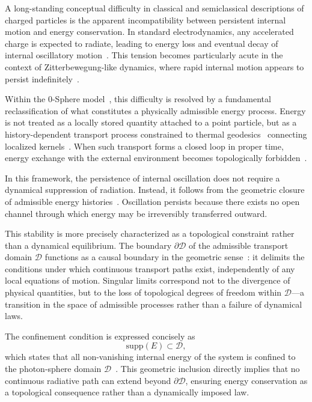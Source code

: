 \documentclass[12pt,a4paper]{article}
\begin{document}
\justifying

A long-standing conceptual difficulty in classical and semiclassical descriptions of charged particles is the apparent incompatibility between persistent internal motion and energy conservation. In standard electrodynamics, any accelerated charge is expected to radiate, leading to energy loss and eventual decay of internal oscillatory motion~\cite{dirac1938,jackson1999}. This tension becomes particularly acute in the context of Zitterbewegung-like dynamics, where rapid internal motion appears to persist indefinitely~\cite{schrodinger1930,hestenes1990,hanamura17765017,hanamura17765318,hanamura18356895}.

Within the 0-Sphere model~\cite{hanamura16759284}, this difficulty is resolved by a fundamental reclassification of what constitutes a physically admissible energy process. Energy is not treated as a locally stored quantity attached to a point particle, but as a history-dependent transport process constrained to thermal geodesics~\cite{hanamura17765349} connecting localized kernels~\cite{hanamura18067760,hanamura18135855,hanamura18203433}. When such transport forms a closed loop in proper time, energy exchange with the external environment becomes topologically forbidden~\cite{hanamura18275142}.

In this framework, the persistence of internal oscillation does not require a dynamical suppression of radiation. Instead, it follows from the geometric closure of admissible energy histories~\cite{hanamura18275142}. Oscillation persists because there exists no open channel through which energy may be irreversibly transferred outward.

This stability is more precisely characterized as a topological constraint rather than a dynamical equilibrium. The boundary $\partial\mathcal{D}$ of the admissible transport domain $\mathcal{D}$ functions as a causal boundary in the geometric sense~\cite{hanamura18356895}: it delimits the conditions under which continuous transport paths exist, independently of any local equations of motion. Singular limits correspond not to the divergence of physical quantities, but to the loss of topological degrees of freedom within $\mathcal{D}$---a transition in the space of admissible processes rather than a failure of dynamical laws.

The confinement condition is expressed concisely as
\begin{equation}
\mathrm{supp}(E) \subset \mathcal{D},
\label{eq:confinement}
\end{equation}
which states that all non-vanishing internal energy of the system is confined to the photon-sphere domain $\mathcal{D}$~\cite{hanamura18356895}. This geometric inclusion directly implies that no continuous radiative path can extend beyond $\partial\mathcal{D}$, ensuring energy conservation as a topological consequence rather than a dynamically imposed law.
\end{document}
